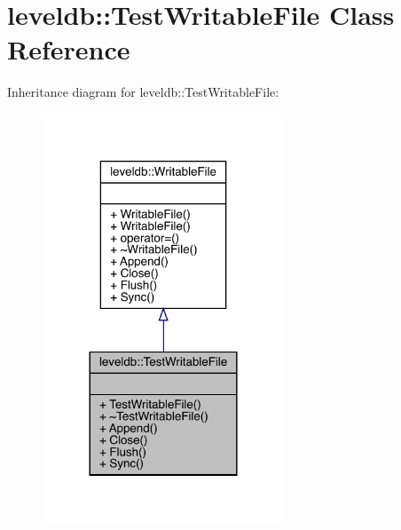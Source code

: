 \hypertarget{classleveldb_1_1_test_writable_file}{}\section{leveldb\+::Test\+Writable\+File Class Reference}
\label{classleveldb_1_1_test_writable_file}


Inheritance diagram for leveldb\+::Test\+Writable\+File\+:
\nopagebreak
\begin{figure}[H]
\begin{center}
\leavevmode
\includegraphics[width=204pt]{classleveldb_1_1_test_writable_file__inherit__graph}
\end{center}
\end{figure}


